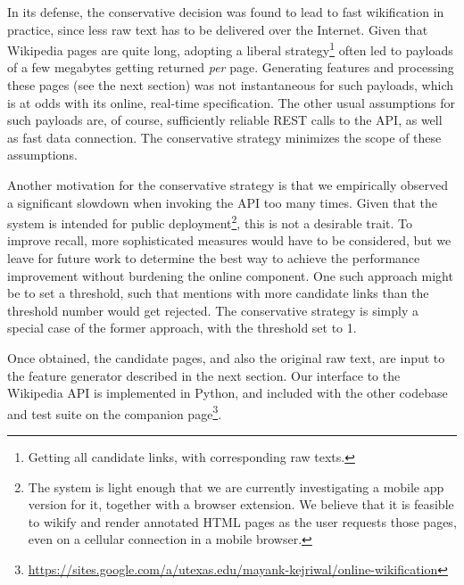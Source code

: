 In its defense, the conservative decision was found to lead to fast wikification in practice, since less raw text has to be delivered over the Internet. Given that Wikipedia pages are quite long, adopting a liberal strategy\footnote{Getting all candidate links, with corresponding raw texts.} often led to payloads of a few megabytes getting returned \emph{per} page. Generating features and processing these pages (see the next section) was not instantaneous for such payloads, which is at odds with its online, real-time specification. The other usual assumptions for such payloads are, of course, sufficiently reliable REST calls to the API, as well as fast data connection. The conservative strategy minimizes the scope of these assumptions. 

Another motivation for the conservative strategy is that we empirically observed a significant slowdown when invoking the API too many times. Given that the system is intended for public deployment\footnote{The system is light enough that we are currently investigating a mobile app version for it, together with a browser extension. We believe that it is feasible to wikify and render annotated HTML pages as the user requests those pages, even on a cellular connection in a mobile browser.}, this is not a desirable trait. To improve recall, more sophisticated measures would have to be considered, but we leave for future work to determine the best way to achieve the performance improvement without burdening the online component. One such approach might be to set a threshold, such that mentions with more candidate links than the threshold number would get rejected. The conservative strategy is simply a special case of the former approach, with the threshold set to 1.  

Once obtained, the candidate pages, and also the original raw text, are input to the feature generator described in the next section. Our interface to the Wikipedia API is implemented in Python, and included with the other codebase and test suite on the companion page\footnote{\url{https://sites.google.com/a/utexas.edu/mayank-kejriwal/online-wikification}}.
